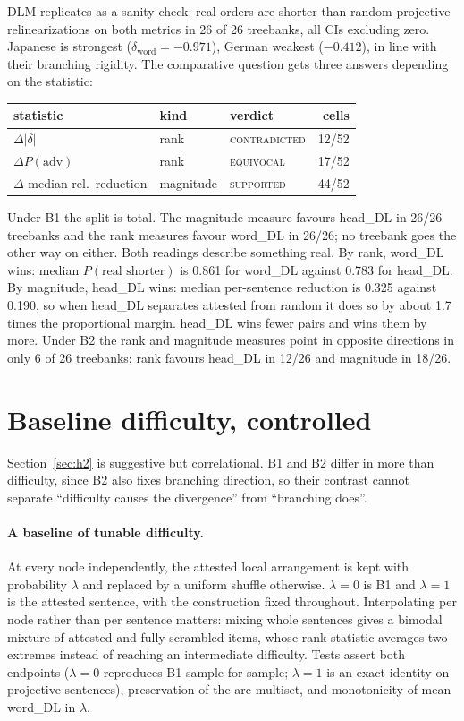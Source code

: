 \documentclass[11pt]{article}
\begin{document}
DLM replicates as a sanity check: real orders are shorter than random projective relinearizations on both metrics in 26 of 26 treebanks, all CIs excluding zero. Japanese is strongest ($\delta_{\text{word}}=-0.971$), German weakest ($-0.412$), in line with their branching rigidity. The comparative question gets three answers depending on the statistic:

\begin{center}\small
\begin{tabular}{lllr}
\toprule
statistic & kind & verdict & cells \\
\midrule
$\Delta|\delta|$ & rank & \textsc{contradicted} & 12/52 \\
$\Delta P(\text{adv})$ & rank & \textsc{equivocal} & 17/52 \\
$\Delta$ median rel.\ reduction & magnitude & \textsc{supported} & 44/52 \\
\bottomrule
\end{tabular}
\end{center}

Under B1 the split is total. The magnitude measure favours head\_DL in 26/26 treebanks and the rank measures favour word\_DL in 26/26; no treebank goes the other way on either. Both readings describe something real. By rank, word\_DL wins: median $P(\text{real shorter})$ is 0.861 for word\_DL against 0.783 for head\_DL. By magnitude, head\_DL wins: median per-sentence reduction is 0.325 against 0.190, so when head\_DL separates attested from random it does so by about 1.7 times the proportional margin. head\_DL wins fewer pairs and wins them by more. Under B2 the rank and magnitude measures point in opposite directions in only 6 of 26 treebanks; rank favours head\_DL in 12/26 and magnitude in 18/26.

\section{Baseline difficulty, controlled}
\label{sec:sweep}

Section~\ref{sec:h2} is suggestive but correlational. B1 and B2 differ in more than difficulty, since B2 also fixes branching direction, so their contrast cannot separate ``difficulty causes the divergence'' from ``branching does''.

\paragraph{A baseline of tunable difficulty.} At every node independently, the attested local arrangement is kept with probability $\lambda$ and replaced by a uniform shuffle otherwise. $\lambda=0$ is B1 and $\lambda=1$ is the attested sentence, with the construction fixed throughout. Interpolating per node rather than per sentence matters: mixing whole sentences gives a bimodal mixture of attested and fully scrambled items, whose rank statistic averages two extremes instead of reaching an intermediate difficulty. Tests assert both endpoints ($\lambda=0$ reproduces B1 sample for sample; $\lambda=1$ is an exact identity on projective sentences), preservation of the arc multiset, and monotonicity of mean word\_DL in $\lambda$.
\end{document}
